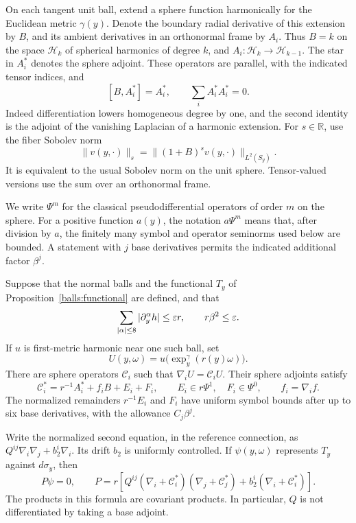 On each tangent unit ball, extend a sphere function harmonically for the
Euclidean metric $\gamma(y)$.  Denote the boundary radial derivative of
this extension by $B$, and its ambient derivatives in an orthonormal frame
by $A_i$.  Thus $B=k$ on the space $\mathcal H_k$ of spherical harmonics
of degree $k$, and $A_i:\mathcal H_k\to\mathcal H_{k-1}$.  The star in
$A_i^*$ denotes the sphere adjoint.  These operators are parallel, with
the indicated tensor indices, and
\begin{equation}\label{angular:elementary-identities}
 [B,A_i^*]=A_i^*,\qquad \sum_i A_i^*A_i^*=0.
\end{equation}
Indeed differentiation lowers homogeneous degree by one, and the second
identity is the adjoint of the vanishing Laplacian of a harmonic extension.
For $s\in\mathbb R$, use the fiber Sobolev norm
\[
 \|v(y,\cdot)\|_s=\|(1+B)^s v(y,\cdot)\|_{L^2(S_y)}.
\]
It is equivalent to the usual Sobolev norm on the unit sphere.  Tensor-valued
versions use the sum over an orthonormal frame.

We write $\Psi^m$ for the classical pseudodifferential operators of order
$m$ on the sphere.  For a positive function $a(y)$, the notation
$a\Psi^m$ means that, after division by $a$, the finitely many symbol and
operator seminorms used below are bounded.  A statement with $j$ base
derivatives permits the indicated additional factor $\beta^j$.

\begin{lemma}\label{angular:trace}
Suppose that the normal balls and the functional $T_y$ of
Proposition~\ref{balls:functional} are defined, and that
\begin{equation}\label{angular:smallness}
 \sum_{|\alpha|\le8}|\partial_y^\alpha h|\le\varepsilon r,
 \qquad r\beta^2\le\varepsilon.
\end{equation}
If $u$ is first-metric harmonic near one such ball, set
\[
 U(y,\omega)=u\bigl(\exp_y^\gamma(r(y)\omega)\bigr).
\]
There are sphere operators $\mathcal C_i$ such that
$\nabla_iU=\mathcal C_iU$.  Their sphere adjoints satisfy
\begin{equation}\label{angular:C-expansion}
 \mathcal C_i^*=r^{-1}A_i^*+f_iB+E_i+F_i,
 \qquad E_i\in r\Psi^1,\quad F_i\in\Psi^0,
 \qquad f_i=\nabla_i f.
\end{equation}
The normalized remainders $r^{-1}E_i$ and $F_i$ have uniform symbol
bounds after up to six base derivatives, with the allowance $C_j\beta^j$.

Write the normalized second equation, in the reference connection, as
$Q^{ij}\nabla_i\nabla_j+b_2^i\nabla_i$.  Its drift $b_2$ is uniformly
controlled.  If $\psi(y,\omega)$ represents $T_y$ against $d\sigma_y$,
then
\begin{equation}\label{angular:P-equation}
 P\psi=0,\qquad
 P=r\left[Q^{ij}(\nabla_i+\mathcal C_i^*)
                    (\nabla_j+\mathcal C_j^*)
             +b_2^i(\nabla_i+\mathcal C_i^*)\right].
\end{equation}
The products in this formula are covariant products.  In particular,
$Q$ is not differentiated by taking a base adjoint.
\end{lemma}

